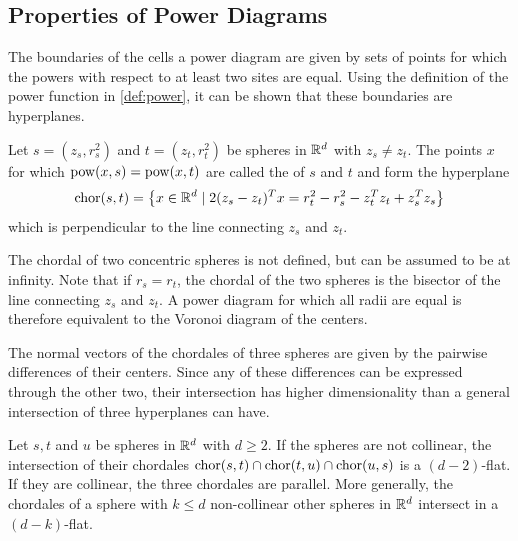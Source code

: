 \subsection{Properties of Power Diagrams}
\label{sub:properties_of_power_diagrams}
The boundaries of the cells a power diagram are given by sets of points for which the powers with respect to at least two sites are equal.
Using the definition of the power function in \cref{def:power}, it can be shown that these boundaries are hyperplanes.
\begin{lemma}
    \label{lem:chordale}
    Let $s = (z_s, r^2_s)$ and $t = (z_t, r^2_t)$ be spheres in $\mathbb{R}^d$ with $z_s \neq z_t$. The points $x$ for which $\operatorname{pow}(x, s) = \operatorname{pow}(x, t)$ are called the  of $s$ and $t$ and form the hyperplane
    \begin{align}
        \operatorname{chor}(s, t) = \left\{ x \in \mathbb{R}^d \mid 2(z_s - z_t)^Tx = r_t^2 - r_s^2 - z_t^Tz_t + z_s^Tz_s \right\}
    \end{align}
    which is perpendicular to the line connecting $z_s$ and $z_t$.
\end{lemma}

The chordal of two concentric spheres is not defined, but can be assumed to be at infinity.
Note that if $r_s = r_t$, the chordal of the two spheres is the bisector of the line connecting $z_s$ and $z_t$.
A power diagram for which all radii are equal is therefore equivalent to the Voronoi diagram of the centers.

The normal vectors of the chordales of three spheres are given by the pairwise differences of their centers.
Since any of these differences can be expressed through the other two, their intersection has higher dimensionality than a general intersection of three hyperplanes can have.
\begin{lemma}
    \label{lem:cellsarepolyhedra}
    Let $s, t$ and $u$ be spheres in $\mathbb{R}^d$ with $d \geq 2$.
    If the spheres are not collinear, the intersection of their chordales $\operatorname{chor}(s,t) \cap \operatorname{chor}(t, u) \cap \operatorname{chor}(u, s)$ is a $(d-2)$-flat.
    If they are collinear, the three chordales are parallel.
    More generally, the chordales of a sphere with $k \leq d$ non-collinear other spheres in $\mathbb{R}^d$ intersect in a $(d-k)$-flat.
\end{lemma}

